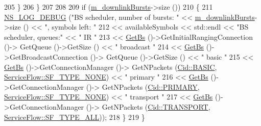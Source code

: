 \begin{DoxyCode}
205         \}
206     \}
207 
208 
209   \textcolor{keywordflow}{if} (\hyperlink{classns3_1_1BSSchedulerSimple_a58431b0c06b4ae64220253afffdbfe06}{m\_downlinkBursts}->size ())
210     \{
211       \hyperlink{group__logging_ga413f1886406d49f59a6a0a89b77b4d0a}{NS\_LOG\_DEBUG} (\textcolor{stringliteral}{"BS scheduler, number of bursts: "} << 
      \hyperlink{classns3_1_1BSSchedulerSimple_a58431b0c06b4ae64220253afffdbfe06}{m\_downlinkBursts}->size () << \textcolor{stringliteral}{", symbols left: "}
212                                                        << availableSymbols << std::endl << \textcolor{stringliteral}{"BS scheduler,
       queues:"} << \textcolor{stringliteral}{" IR "}
213                                                        << \hyperlink{classns3_1_1BSScheduler_a8b09065ac8f74cb35446af55128e41c7}{GetBs} ()->GetInitialRangingConnection ()->
      GetQueue ()->GetSize () << \textcolor{stringliteral}{" broadcast "}
214                                                        << \hyperlink{classns3_1_1BSScheduler_a8b09065ac8f74cb35446af55128e41c7}{GetBs} ()->GetBroadcastConnection ()->
      GetQueue ()->GetSize () << \textcolor{stringliteral}{" basic "}
215                                                        << \hyperlink{classns3_1_1BSScheduler_a8b09065ac8f74cb35446af55128e41c7}{GetBs} ()->GetConnectionManager ()->
      GetNPackets (\hyperlink{classns3_1_1Cid_a10b8f92080ca5790e65a0bfa2f557e0aa68b82b5b38abe3f2b40e5e3d950ac746}{Cid::BASIC}, \hyperlink{classns3_1_1ServiceFlow_a7990ba10be1e098328fd1e6382a26235a1c9639853c5529ae013feddcae94a4c6}{ServiceFlow::SF\_TYPE\_NONE}) << \textcolor{stringliteral}{" primary "}
216                                                        << \hyperlink{classns3_1_1BSScheduler_a8b09065ac8f74cb35446af55128e41c7}{GetBs} ()->GetConnectionManager ()->
      GetNPackets (\hyperlink{classns3_1_1Cid_a10b8f92080ca5790e65a0bfa2f557e0aa0ffb28b79686aa37c614c868e330418b}{Cid::PRIMARY}, \hyperlink{classns3_1_1ServiceFlow_a7990ba10be1e098328fd1e6382a26235a1c9639853c5529ae013feddcae94a4c6}{ServiceFlow::SF\_TYPE\_NONE}) << \textcolor{stringliteral}{" transport "}
217                                                        << \hyperlink{classns3_1_1BSScheduler_a8b09065ac8f74cb35446af55128e41c7}{GetBs} ()->GetConnectionManager ()->
      GetNPackets (\hyperlink{classns3_1_1Cid_a10b8f92080ca5790e65a0bfa2f557e0aa46fbed56841c3bf471aa84de022edf87}{Cid::TRANSPORT}, \hyperlink{classns3_1_1ServiceFlow_a7990ba10be1e098328fd1e6382a26235aaf7e58e43027cc9d351cd100a9d6dee3}{ServiceFlow::SF\_TYPE\_ALL}));
218     \}
219 \}
\end{DoxyCode}


